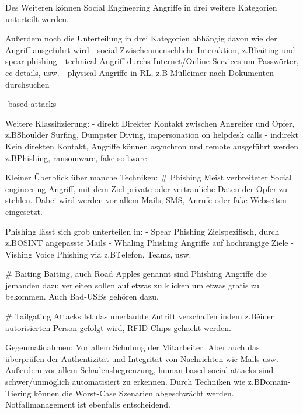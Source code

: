 Des Weiteren können Social Engineering Angriffe in drei weitere Kategorien unterteilt werden.


Außerdem noch die Unterteilung in drei Kategorien abhängig davon wie der Angriff ausgeführt wird
- social
    Zwischenmenschliche Interaktion, z.B\. baiting und spear phishing
- technical
    Angriff durchs Internet/Online Services um Passwörter, cc details, usw.
- physical
    Angriffe in RL, z.B \. Mülleimer nach Dokumenten durchsuchen

-based attacks


Weitere Klassifizierung:
- direkt
    Direkter Kontakt zwischen Angreifer und Opfer, z.B\. Shoulder Surfing, Dumpster Diving, impersonation on helpdesk calls
- indirekt
    Kein direkten Kontakt, Angriffe können asynchron und remote ausgeführt werden z.B\. Phishing, ransomware, fake software

Kleiner Überblick über manche Techniken:
# Phishing
    Meist verbreiteter Social engineering Angriff, mit dem Ziel private oder vertrauliche Daten der Opfer zu stehlen.
    Dabei wird werden vor allem Mails, SMS, Anrufe oder fake Webseiten eingesetzt.

Phishing lässt sich grob unterteilen in:
- Spear Phishing
    Zielspezifisch, durch z.B\. OSINT angepasste Mails
- Whaling Phishing
    Angriffe auf hochrangige Ziele
- Vishing
    Voice Phishing via z.B\. Telefon, Teams, usw.


# Baiting
Baiting, auch Road Apples genannt sind Phishing Angriffe die jemanden dazu verleiten sollen auf etwas zu klicken um
etwas gratis zu bekommen. Auch Bad-USBs gehören dazu.

# Tailgating Attacks
Ist das unerlaubte Zutritt verschaffen indem z.B\. einer autorisierten Person gefolgt wird, RFID Chips gehackt werden.

Gegenmaßnahmen:
Vor allem Schulung der Mitarbeiter. Aber auch das überprüfen der Authentizität und Integrität von Nachrichten wie
Mails usw.
Außerdem vor allem Schadensbegrenzung, human-based social attacks sind schwer/unmöglich automatisiert zu erkennen.
Durch Techniken wie z.B\. Domain-Tiering können die Worst-Case Szenarien abgeschwächt werden.
Notfallmanagement ist ebenfalls entscheidend.